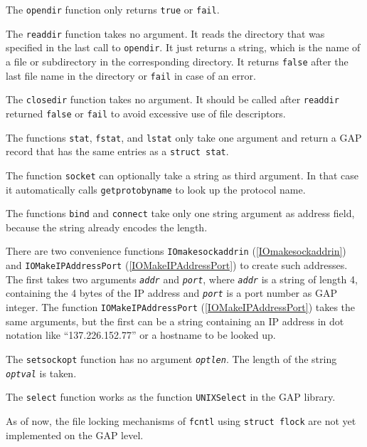 \documentclass[a4paper,11pt]{report}
\begin{document}
{{ The \texttt{opendir} function only returns \texttt{true} or \texttt{fail}. 

 The \texttt{readdir} function takes no argument. It reads the directory that was specified in the
last call to \texttt{opendir}. It just returns a string, which is the name of a file or subdirectory in the
corresponding directory. It returns \texttt{false} after the last file name in the directory or \texttt{fail} in case of an error. 

 The \texttt{closedir} function takes no argument. It should be called after \texttt{readdir} returned \texttt{false} or \texttt{fail} to avoid excessive use of file descriptors. 

 The functions \texttt{stat}, \texttt{fstat}, and \texttt{lstat} only take one argument and return a \textsf{GAP} record that has the same entries as a \texttt{struct stat}.

 The function \texttt{socket} can optionally take a string as third argument. In that case it automatically
calls \texttt{getprotobyname} to look up the protocol name.

 The functions \texttt{bind} and \texttt{connect} take only one string argument as address field, because the string already
encodes the length.

 There are two convenience functions \texttt{IO{\textunderscore}make{\textunderscore}sockaddr{\textunderscore}in} (\ref{IOmakesockaddrin}) and \texttt{IO{\textunderscore}MakeIPAddressPort} (\ref{IOMakeIPAddressPort}) to create such addresses. The first takes two arguments \mbox{\texttt{\mdseries\slshape addr}} and \mbox{\texttt{\mdseries\slshape port}}, where \mbox{\texttt{\mdseries\slshape addr}} is a string of length 4, containing the 4 bytes of the IP address and \mbox{\texttt{\mdseries\slshape port}} is a port number as \textsf{GAP} integer. The function \texttt{IO{\textunderscore}MakeIPAddressPort} (\ref{IOMakeIPAddressPort}) takes the same arguments, but the first can be a string containing an IP
address in dot notation like ``137.226.152.77'' or a hostname to be looked up.

 The \texttt{setsockopt} function has no argument \mbox{\texttt{\mdseries\slshape optlen}}. The length of the string \mbox{\texttt{\mdseries\slshape optval}} is taken.

 The \texttt{select} function works as the function \texttt{UNIXSelect} in the \textsf{GAP} library.

 As of now, the file locking mechanisms of \texttt{fcntl} using \texttt{struct flock} are not yet implemented on the \textsf{GAP} level. }

}
\end{document}
